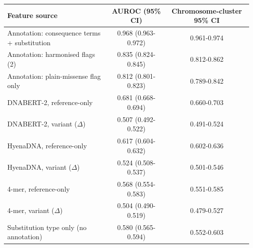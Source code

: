 \begin{tabular}{lcc}\toprule
Feature source & AUROC (95\% CI) & Chromosome-cluster 95\% CI\\\midrule
Annotation: consequence terms + substitution & 0.968 (0.963-0.972) & 0.961-0.974\\
Annotation: harmonised flags (2) & 0.835 (0.824-0.845) & 0.812-0.862\\
Annotation: plain-missense flag only & 0.812 (0.801-0.823) & 0.789-0.842\\
\midrule
DNABERT-2, reference-only & 0.681 (0.668-0.694) & 0.660-0.703\\
DNABERT-2, variant ($\Delta$) & 0.507 (0.492-0.522) & 0.491-0.524\\
HyenaDNA, reference-only & 0.617 (0.604-0.632) & 0.602-0.636\\
HyenaDNA, variant ($\Delta$) & 0.524 (0.508-0.537) & 0.501-0.546\\
4-mer, reference-only & 0.568 (0.554-0.583) & 0.551-0.585\\
4-mer, variant ($\Delta$) & 0.504 (0.490-0.519) & 0.479-0.527\\
Substitution type only (no annotation) & 0.580 (0.565-0.594) & 0.552-0.603\\
\bottomrule\end{tabular}
